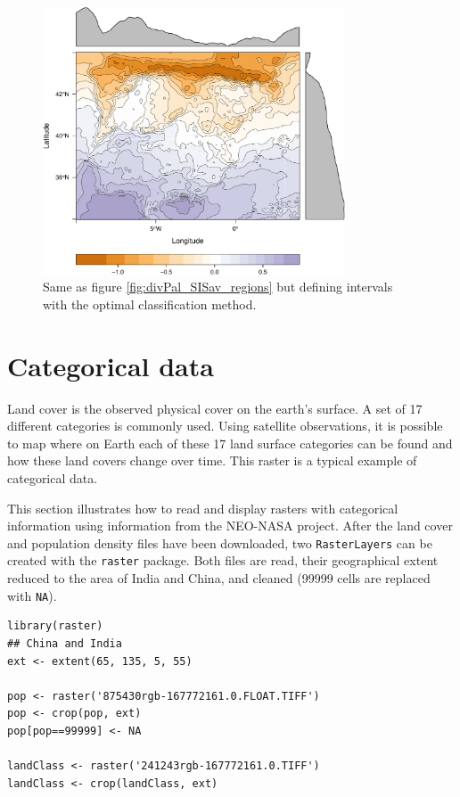 \begin{figure}[h!]
\centering
\includegraphics[width=0.8\textwidth]{figs/divPalSISav_classInt.pdf}
\caption{\label{fig:divPalSISav_classInt}Same as figure \ref{fig:divPal_SISav_regions} but defining intervals with the optimal classification method.}
\end{figure}
\section{Categorical data}
\label{sec-2}



Land cover is the observed physical cover on the earth's
surface. A set of 17 different categories is commonly used. Using
satellite observations, it is possible to map where on Earth each of
these 17 land surface categories can be found and how these land
covers change over time. This raster is a typical example of
categorical data. 

This section illustrates how to read and display rasters with
categorical information using information from the NEO-NASA
project. After the land cover and population density files have
been downloaded, two \texttt{RasterLayers} can be created with the
\texttt{raster} package. Both files are read, their geographical extent
reduced to the area of India and China, and cleaned (99999 cells
are replaced with \texttt{NA}).


\lstset{language=R}
\begin{lstlisting}
library(raster)
## China and India  
ext <- extent(65, 135, 5, 55)

pop <- raster('875430rgb-167772161.0.FLOAT.TIFF')
pop <- crop(pop, ext)
pop[pop==99999] <- NA

landClass <- raster('241243rgb-167772161.0.TIFF')
landClass <- crop(landClass, ext)
\end{lstlisting}



